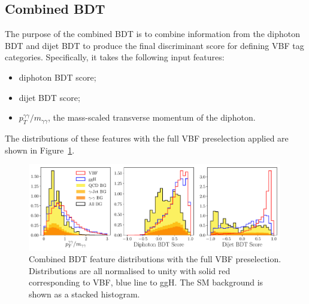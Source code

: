 \subsection{Combined BDT}
The purpose of the combined BDT is to combine information from the diphoton BDT and dijet BDT to produce the final discriminant score for defining VBF tag categories. 
Specifically, it takes the following input features:
\begin{itemize}[noitemsep]
    \item diphoton BDT score;
    \item dijet BDT score;
    \item $p_{T}^{\gamma\gamma}/m_{\gamma\gamma}$, the mass-scaled transverse momentum of the diphoton.
\end{itemize}
The distributions of these features with the full VBF preselection applied are shown in Figure~\ref{fig:event_categorisaton:combined_bdt_features}.
\begin{figure}[h!]
    \centering
    \includegraphics[width=0.99\textwidth]{figures/event_selection/combined_BDT_features_splitBG_PS.pdf}
    \caption{Combined BDT feature distributions with the full VBF preselection. Distributions are all normalised to unity with solid red corresponding to VBF, blue line to ggH. The SM background is shown as a stacked histogram.}
    \label{fig:event_categorisaton:combined_bdt_features}
\end{figure}

